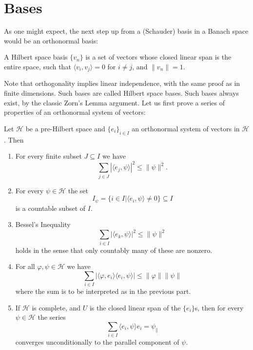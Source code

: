 \documentclass[twoside,symmetric, openany, 12pt]{./tuftebook}
\theoremstyle{definition}
\theoremstyle{definition}
\theoremstyle{definition}
\newenvironment{parts}{\begin{enumerate}[label=(\alph*)]}{\end{enumerate}}
\begin{document}
\section{Bases}
As one might expect, the next step up from a (Schauder) basis in a Banach space would be an orthonormal basis:
\begin{Definition}
	A Hilbert space basis $\{v_n\}$ is a set of vectors whose closed linear span is the entire space, such that $\langle v_i, v_j\rangle =0$ for $i\neq j$, and $\|v_n\| = 1$.
\end{Definition}
Note that orthogonality implies linear independence, with the same proof as in finite dimensions. Such bases are called Hilbert space bases. Such bases always exist, by the classic Zorn's Lemma argument. Let us first prove a series of properties of an orthonormal system of vectors:
\begin{Theorem}
	Let $\mathcal{H}$ be a pre-Hilbert space and $\{e_i\}_{i\in I}$ an orthonormal system of vectors in $\mathcal{H}$. Then
	\begin{parts}
		\item For every finite subset $J\subseteq I$ we have
		\[\sum_{j\in J}|\langle e_j, \psi\rangle|^2 \le \|\psi\|^2.\]
		\item For every $\psi\in \mathcal{H}$ the set
		\[I_\psi = \{i\in I|\langle e_i, \psi\rangle \neq 0\}\subseteq I\]
		is a countable subset of $I$.
		\item Bessel's Inequality
		\[
		\sum_{i\in I} |\langle e_k, \psi\rangle|^2 \le \|\psi\|^2
		\]
		holds in the sense that only countably many of these are nonzero.
		\item For all $\varphi, \psi\in \mathcal{H}$ we have
		\[\sum_{i\in I}|\langle \varphi, e_i\rangle \langle e_i, \psi\rangle|\le \|\varphi\| \|\psi\|\] 
		where the sum is to be interpreted as in the previous part.
		\item If $\mathcal{H}$ is complete, and $U$ is the closed linear span of the $\{e_i\}$s, then for every $\psi\in \mathcal{H}$ the series
		\[\sum_{i\in I}\langle e_i, \psi\rangle e_i=\psi_{\parallel}\]
		converges unconditionally to the parallel component of $\psi$.
	\end{parts}
\end{Theorem}
\end{document}
